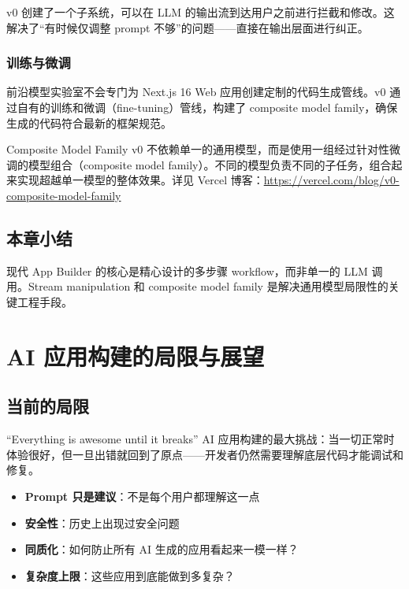 \documentclass[a4paper]{article}
\begin{document}
v0 创建了一个子系统，可以在 LLM 的输出流到达用户之前进行拦截和修改。这解决了``有时候仅调整 prompt 不够''的问题——直接在输出层面进行纠正。

\subsubsection{训练与微调}

前沿模型实验室不会专门为 Next.js 16 Web 应用创建定制的代码生成管线。v0 通过自有的训练和微调（fine-tuning）管线，构建了 composite model family，确保生成的代码符合最新的框架规范。

\begin{knowledgebox}{Composite Model Family}
v0 不依赖单一的通用模型，而是使用一组经过针对性微调的模型组合（composite model family）。不同的模型负责不同的子任务，组合起来实现超越单一模型的整体效果。详见 Vercel 博客：\url{https://vercel.com/blog/v0-composite-model-family}
\end{knowledgebox}

\subsection{本章小结}

现代 App Builder 的核心是精心设计的多步骤 workflow，而非单一的 LLM 调用。Stream manipulation 和 composite model family 是解决通用模型局限性的关键工程手段。

\section{AI 应用构建的局限与展望}

\subsection{当前的局限}

\begin{warningbox}{``Everything is awesome until it breaks''}
AI 应用构建的最大挑战：当一切正常时体验很好，但一旦出错就回到了原点——开发者仍然需要理解底层代码才能调试和修复。
\end{warningbox}

\begin{itemize}
    \item \textbf{Prompt 只是建议}：不是每个用户都理解这一点
    \item \textbf{安全性}：历史上出现过安全问题
    \item \textbf{同质化}：如何防止所有 AI 生成的应用看起来一模一样？
    \item \textbf{复杂度上限}：这些应用到底能做到多复杂？
\end{itemize}
\end{document}
